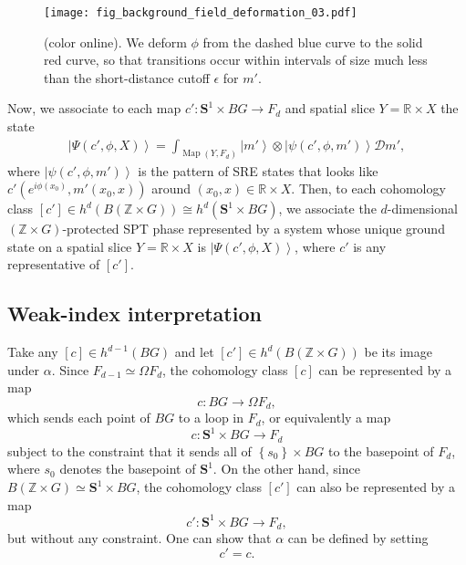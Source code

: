 \documentclass[sort&compress]{elsarticle}
\theoremstyle{theoremstyle}
\theoremstyle{framedtheoremstyle}
\theoremstyle{definitionstyle}
\theoremstyle{definitionstyle}
\theoremstyle{definitionstyle}
\theoremstyle{definitionstyle}
\theoremstyle{nameddefinitionstyle}
\theoremstyle{framednameddefinitionstyle}
\theoremstyle{proofstyle}
\theoremstyle{definitionstyle}
\newcommand{\fromto}{\rightarrow}
\newcommand{\ZZZ}{\mathbb{Z}}
\newcommand{\RRR}{\mathbb{R}}
\renewcommand{\SS}{\mathbf{S}}
\newcommand{\D}{\mathcal{D}}
\DeclareMathOperator{\Map}{Map}
\newcommand{\homotopic}{\simeq}
\newcommand{\isomorphic}{\cong}
\newcommand{\paren}[1]{\left( #1 \right)}
\newcommand{\brackets}[1]{\left[ #1 \right]}
\newcommand{\braces}[1]{\left\{ #1 \right\}}
\newcommand{\ket}[1]{\left|#1\right\rangle}
\begin{document}
\begin{appendices}
\begin{figure}
\centering
\texttt{[image: fig\_background\_field\_deformation\_03.pdf]}
\caption{(color online). We deform $\phi$ from the dashed blue curve to the solid red curve, so that transitions occur within intervals of size much less than the short-distance cutoff $\epsilon$ for $m'$.}
\label{fig:background_field_deformation}
\end{figure}

Now, we associate to each map $c': \SS^1 \times BG \fromto F_d$ and spatial slice $Y = \RRR \times X$ the state
\begin{eqnarray}
\ket{\Psi\paren{c',\phi, X}}
= \int_{\Map\paren{Y, F_d}} \ket{m'} \otimes \ket{\psi\paren{c',\phi, m'}} \D m',
\end{eqnarray}
where $\ket{\psi\paren{c',\phi, m'}}$ is the pattern of SRE states that looks like $c'\paren{e^{i\phi(x_0)}, m'(x_0, x)}$ around $(x_0, x)\in \RRR \times X$. Then, to each cohomology class $\brackets{c'} \in h^d\paren{B \paren{\ZZZ \times G}} \isomorphic h^d\paren{\SS^1 \times BG}$, we associate the $d$-dimensional $\paren{\ZZZ\times G}$-protected SPT phase represented by a system whose unique ground state on a spatial slice $Y = \RRR \times X$ is $\ket{\Psi\paren{c',\phi, X}}$, where $c'$ is any representative of $\brackets{c'}$.





\subsection{Weak-index interpretation \label{subapp:weak_index_interpretation}}

Take any $\brackets{c} \in h^{d-1} \paren{BG}$ and let $\brackets{c'} \in h^d\paren{B\paren{\ZZZ \times G}}$ be its image under $\alpha$. Since $F_{d-1} \homotopic \Omega F_d$, the cohomology class $\brackets{c}$ can be represented by a map
\begin{equation}
c: BG \fromto \Omega F_d,
\end{equation}
which sends each point of $BG$ to a loop in $F_d$, or equivalently a map
\begin{equation}
c: \SS^1 \times BG \fromto F_d
\end{equation}
subject to the constraint that it sends all of $\braces{s_0} \times BG$ to the basepoint of $F_d$, where $s_0$ denotes the basepoint of $\SS^1$. On the other hand, since $B\paren{\ZZZ \times G} \homotopic \SS^1 \times BG$, the cohomology class $\brackets{c'}$ can also be represented by a map
\begin{equation}
c': \SS^1 \times BG \fromto F_d,
\end{equation}
but without any constraint. One can show that $\alpha$ can be defined by setting
\begin{equation}
c' = c.
\end{equation}


\end{appendices}
\end{document}
